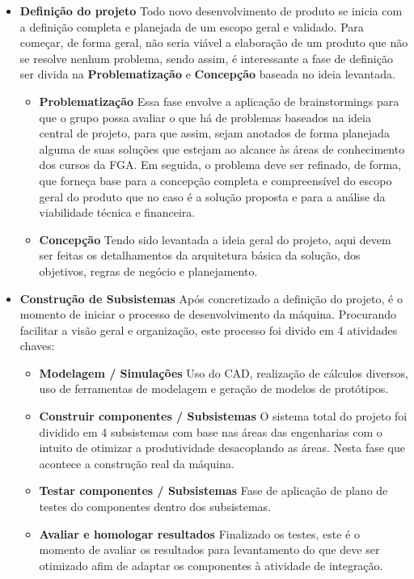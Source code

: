 \begin{apendicesenv}
\begin{itemize}
    \item \textbf{Definição do projeto}
        Todo novo desenvolvimento de produto se inicia com a definição completa e planejada de um escopo geral e validado. Para começar, de forma geral, não seria viável a elaboração de um produto que não se resolve nenhum problema, sendo assim, é interessante a fase de definição ser divida na \textbf{Problematização} e \textbf{Concepção} baseada no ideia levantada.
        \begin{itemize}
            \item \textbf{Problematização}
                Essa fase envolve a aplicação de brainstormings para que o grupo possa avaliar o que há de problemas baseados na ideia central de projeto, para que assim, sejam anotados de forma planejada alguma de suas soluções que estejam ao alcance às áreas de conhecimento dos cursos da FGA. Em seguida, o problema deve ser refinado, de forma, que forneça base para a concepção completa e compreensível do escopo geral do produto que no caso é a solução proposta e para a análise da viabilidade técnica e financeira.
            \item \textbf{Concepção}
                Tendo sido levantada a ideia geral do projeto, aqui devem ser feitas os detalhamentos da arquitetura básica da solução, dos objetivos, regras de negócio e planejamento.
        \end{itemize}
    
    \item \textbf{Construção de Subsistemas}
        Após concretizado a definição do projeto, é o momento de iniciar o processo de desenvolvimento da máquina. Procurando facilitar a visão geral e organização, este processo foi divido em 4 atividades chaves:
        \begin{itemize}
            \item \textbf{Modelagem / Simulações}
                Uso do CAD, realização de cálculos diversos, uso de ferramentas de modelagem e geração de modelos de protótipos.
            \item \textbf{Construir componentes / Subsistemas}
                O sistema total do projeto foi dividido em 4 subsistemas com base nas áreas das engenharias com o intuito de otimizar a produtividade desacoplando as áreas. Nesta fase que acontece a construção real da máquina.
            \item \textbf{Testar componentes / Subsistemas}
                Fase de aplicação de plano de testes do componentes dentro dos subsistemas.
            \item \textbf{Avaliar e homologar resultados}
                Finalizado os testes, este é o momento de avaliar os resultados para levantamento do que deve ser otimizado afim de adaptar os componentes à atividade de integração. 
        \end{itemize}


\end{itemize}
\end{apendicesenv}
